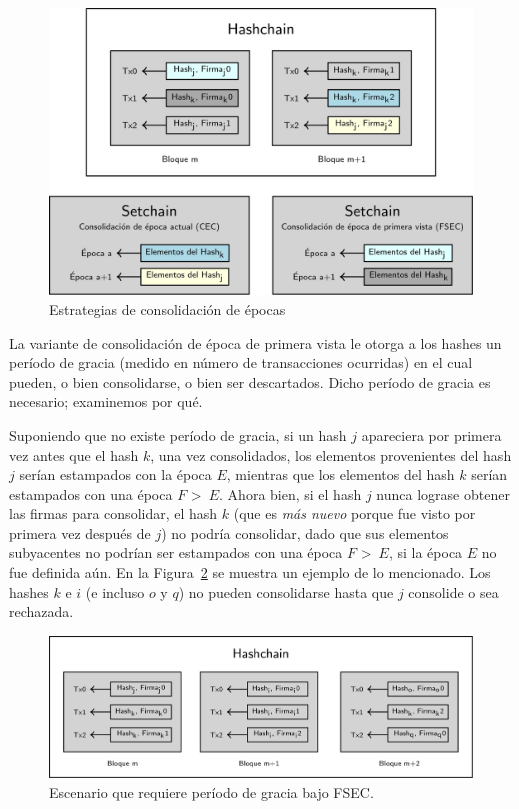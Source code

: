 \begin{figure}
  \centering
  \includegraphics[scale=0.28]{figures/consolidation-example-2.png}
  \caption{Estrategias de consolidación de épocas}
  \label{fig:consolidation_epoch}
\end{figure}

La variante de consolidación de época de primera vista le otorga a los hashes un período
de gracia (medido en número de transacciones ocurridas) en el cual pueden, o bien
consolidarse, o bien ser descartados.
%
Dicho período de gracia es necesario; examinemos por qué.


Suponiendo que no existe período de gracia, si un hash $j$ apareciera por primera vez
antes que el hash $k$, una vez consolidados, los elementos provenientes del hash $j$
serían estampados con la época $E$, mientras que los elementos del hash $k$ serían estampados
con una época $F$ \textgreater \ $E$.
%
Ahora bien, 
%
si el hash $j$ nunca lograse obtener las \SPH firmas para
consolidar, el hash $k$ (que es \textit{más nuevo} porque fue visto por primera vez
después de $j$) no podría consolidar, dado que sus elementos subyacentes no podrían ser
estampados con una época $F$ \textgreater \ $E$, si la época $E$ no fue definida aún.
%
En la Figura~\ref{fig:grace_period} se muestra un ejemplo de lo mencionado. Los hashes
$k$ e $i$ (e incluso $o$ y $q$) no pueden consolidarse hasta que $j$ consolide o sea rechazada.

\begin{figure}
  \centering
  \includegraphics[scale=0.25]{figures/grace-period-example.png}
  \caption{Escenario que requiere período de gracia bajo FSEC.}
  \label{fig:grace_period}
\end{figure}

